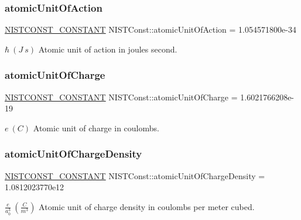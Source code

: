 \subsubsection{\texorpdfstring{atomic\+Unit\+Of\+Action}{atomicUnitOfAction}}
{\footnotesize\ttfamily \mbox{\hyperlink{group___n_i_s_t_const-_macros_ga2b0fc1d7452373f816175dd86ce26729}{N\+I\+S\+T\+C\+O\+N\+S\+T\+\_\+\+C\+O\+N\+S\+T\+A\+NT}} N\+I\+S\+T\+Const\+::atomic\+Unit\+Of\+Action = 1.\+054571800e-\/34}

$\hbar \ (J\ s)$ Atomic unit of action in joules second. \mbox{\label{group___n_i_s_t_const-_atomic_unit_gaa850ac93fa2ec31582147af4bcafd984}} 
\subsubsection{\texorpdfstring{atomic\+Unit\+Of\+Charge}{atomicUnitOfCharge}}
{\footnotesize\ttfamily \mbox{\hyperlink{group___n_i_s_t_const-_macros_ga2b0fc1d7452373f816175dd86ce26729}{N\+I\+S\+T\+C\+O\+N\+S\+T\+\_\+\+C\+O\+N\+S\+T\+A\+NT}} N\+I\+S\+T\+Const\+::atomic\+Unit\+Of\+Charge = 1.\+6021766208e-\/19}

$e \ (C)$ Atomic unit of charge in coulombs. \mbox{\label{group___n_i_s_t_const-_atomic_unit_gaaeb55a2b43e7885495495e2a613eb481}} 
\subsubsection{\texorpdfstring{atomic\+Unit\+Of\+Charge\+Density}{atomicUnitOfChargeDensity}}
{\footnotesize\ttfamily \mbox{\hyperlink{group___n_i_s_t_const-_macros_ga2b0fc1d7452373f816175dd86ce26729}{N\+I\+S\+T\+C\+O\+N\+S\+T\+\_\+\+C\+O\+N\+S\+T\+A\+NT}} N\+I\+S\+T\+Const\+::atomic\+Unit\+Of\+Charge\+Density = 1.\+0812023770e12}

$\frac{e}{a_0^3} \ (\frac{C}{m^3})$ Atomic unit of charge density in coulombs per meter cubed. \mbox{\label{group___n_i_s_t_const-_atomic_unit_ga664164b535c0f978a02afff805d58a34}} 
